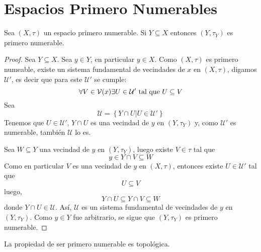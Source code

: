 \documentclass[12pt]{report}
\theoremstyle{largebreak}
\begin{document}
    \section{Espacios Primero Numerables}

    \begin{propo}
        Sea $(X,\tau)$ un espacio primero numerable. Si $Y\subseteq X$ entonces $(Y,\tau_Y)$ es primero numerable.
    \end{propo}

    \begin{proof}
        Sea $Y\subseteq X$. Sea $y\in Y$, en particular $y\in X$. Como $(X,\tau)$ es primero numeable, existe un sistema fundamental de vecindades de $x$ en $(X,\tau)$, digamos $\mathcal{U}'$, es decir que para este $\mathcal{U}'$ se cumple:
        \begin{equation*}
            \forall V\in\mathcal{V}(x)\exists U\in\mathcal{U}'\textup{ tal que }U\subseteq V
        \end{equation*}
        Sea
        \begin{equation*}
            \mathcal{U}=\left\{Y\cap U\Big|U\in\mathcal{U}' \right\}
        \end{equation*}
        Tenemos que $U\in\mathcal{U}'$, $Y\cap U$ es una vecindad de $y$ en $(Y,\tau_Y)$ y, como $\mathcal{U}'$ es numerable, también $\mathcal{U}$ lo es.

        Sea $W\subseteq Y$ una vecindad de $y$ en $(Y,\tau_Y)$, luego existe $V\in\tau$ tal que
        \begin{equation*}
            y\in Y\cap V\subseteq W
        \end{equation*}
        Como en particular $V$ es una vecindad de $y$ en $(X,\tau)$, entonces existe $U\in\mathcal{U}'$ tal que
        \begin{equation*}
            U\subseteq V
        \end{equation*}
        luego,
        \begin{equation*}
            Y\cap U\subseteq Y\cap V\subseteq W
        \end{equation*} 
        donde $Y\cap U\in\mathcal{U}$. Así, $\mathcal{U}$ es un sistema fundamental de vecindades de $y$ en $(Y,\tau_Y)$. Como $y\in Y$ fue arbitrario, se sigue que $(Y,\tau_Y)$ es primero numerable.
    \end{proof}

    \begin{propo}
        La propiedad de ser primero numerable es topológica.
    \end{propo}
\end{document}
